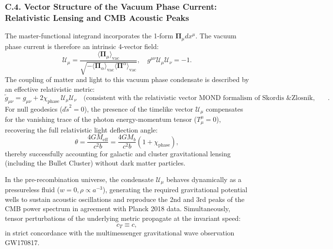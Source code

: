 \documentclass[11pt,a4paper]{article}
\theoremstyle{definition}
\begin{document}
\subsubsection*{C.4. Vector Structure of the Vacuum Phase Current: Relativistic Lensing and CMB Acoustic Peaks}

The master-functional integrand incorporates the 1-form $\mathbf{\Pi}_\mu dx^\mu$. The vacuum phase current is therefore an intrinsic 4-vector field:
\begin{equation}\label{eq:C.10_en}\tag{C.10}
\mathcal{U}_\mu = \frac{\langle \mathbf{\Pi}_\mu \rangle_{\text{vac}}}{\sqrt{-\langle \mathbf{\Pi}_\alpha \rangle_{\text{vac}} \langle \mathbf{\Pi}^\alpha \rangle_{\text{vac}}}}, \quad g^{\mu\nu} \mathcal{U}_\mu \mathcal{U}_\nu = -1.
\end{equation}
The coupling of matter and light to this vacuum phase condensate is described by an effective relativistic metric:
\begin{equation}\label{eq:C.11_en}\tag{C.11}
\tilde{g}_{\mu\nu} = g_{\mu\nu} + 2 \chi_{\text{phase}} \, \mathcal{U}_\mu \mathcal{U}_\nu \quad \text{(consistent with the relativistic vector MOND formalism of Skordis \& Zlosnik, 2021)}.
\end{equation}
For null geodesics ($d\tilde{s}^2 = 0$), the presence of the timelike vector $\mathcal{U}_\mu$ compensates for the vanishing trace of the photon energy-momentum tensor ($T^\mu_\mu = 0$), recovering the full relativistic light deflection angle:
\begin{equation}\label{eq:C.12_en}\tag{C.12}
\theta = \frac{4 G M_{\text{eff}}}{c^2 b} = \frac{4 G M_b}{c^2 b}(1 + \chi_{\text{phase}}),
\end{equation}
thereby successfully accounting for galactic and cluster gravitational lensing (including the Bullet Cluster) without dark matter particles.

In the pre-recombination universe, the condensate $\mathcal{U}_\mu$ behaves dynamically as a pressureless fluid ($w = 0, \rho \propto a^{-3}$), generating the required gravitational potential wells to sustain acoustic oscillations and reproduce the 2nd and 3rd peaks of the CMB power spectrum in agreement with Planck 2018 data. Simultaneously, tensor perturbations of the underlying metric propagate at the invariant speed:
\begin{equation}\label{eq:C.13_en}\tag{C.13}
c_T \equiv c,
\end{equation}
in strict concordance with the multimessenger gravitational wave observation GW170817.
\end{document}
